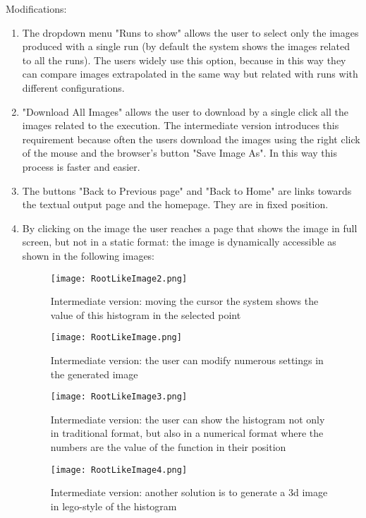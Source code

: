 Modifications:
\begin{enumerate}

\item The dropdown menu "Runs to show" allows the user to select only the images produced with a single run (by default the system shows the images related to all the runs). The users widely use this option, because in this way they can compare images extrapolated in the same way but related with runs with different configurations.

\item "Download All Images" allows the user to download by a single click all the images related to the execution. The intermediate version introduces this requirement because often the users download the images using the right click of the mouse and the browser's button "Save Image As". In this way this process is faster and easier.

\item The buttons "Back to Previous page" and "Back to Home" are links towards the textual output page and the homepage. They are in fixed position.

\item By clicking on the image the user reaches a page that shows the image in full screen, but not in a static format: the image is dynamically accessible as shown in the following images:

\begin{figure}[H]
\centering
\texttt{[image: RootLikeImage2.png]} 
\caption{Intermediate version: moving the cursor the system shows the value of this histogram in the selected point}
\end{figure}



\begin{figure}[H]
\centering
\texttt{[image: RootLikeImage.png]} 
\caption{Intermediate version: the user can modify numerous settings in the generated image}
\end{figure}

\begin{figure}[H]
\centering
\texttt{[image: RootLikeImage3.png]} 
\caption{Intermediate version: the user can show the histogram not only in traditional format, but also in a numerical format where the numbers are the value of the function in their position}
\end{figure}

\begin{figure}[H]
\centering
\texttt{[image: RootLikeImage4.png]} 
\caption{Intermediate version: another solution is to generate a 3d image in lego-style of the histogram}
\end{figure}


 
\end{enumerate}


